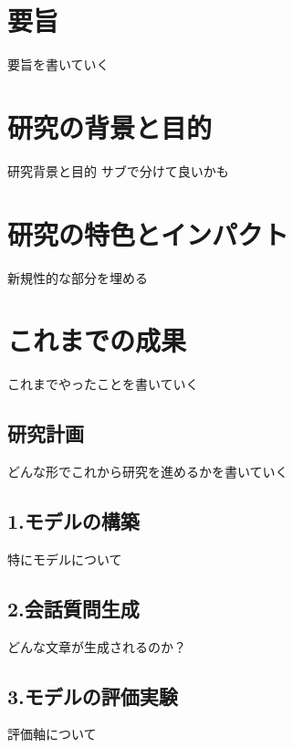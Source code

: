 \documentclass[a4paper,12pt]{jsarticle}
\begin{document}
\begin{framed}
  \section*{要旨}
  要旨を書いていく
  \section*{研究の背景と目的}
  研究背景と目的
  サブで分けて良いかも
  \section*{研究の特色とインパクト}
  新規性的な部分を埋める
  \section*{これまでの成果}
  これまでやったことを書いていく
  \end{framed}

  \newpage
  \begin{framed}
  \section*{研究計画}
  どんな形でこれから研究を進めるかを書いていく
  \subsection*{1.モデルの構築}
  特にモデルについて
  \subsection*{2.会話質問生成}
  どんな文章が生成されるのか？
  \subsection*{3.モデルの評価実験}
  評価軸について
  \end{framed}
\end{document}
